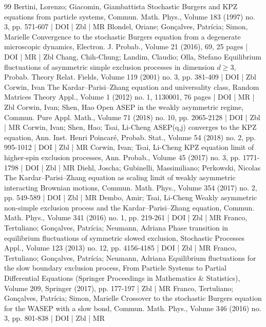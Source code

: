 \documentclass[10pt]{amsart}
\theoremstyle{definition}\newtheorem{defi}[theo]{Definition}\newtheorem{rema}[theo]{Remark}\newtheorem{exam}[theo]{Example}\newtheorem{exem}[theo]{Example}\newtheorem{nota}[theo]{Notation}
\renewcommand{\ge}{\geqslant}
\begin{document}
\begin{thebibliography}{99}
Bertini, Lorenzo; Giacomin, Giambattista Stochastic Burgers and KPZ equations from particle systems, Commun. Math. Phys., Volume 183 (1997) no. 3, pp. 571-607 | DOI | Zbl | MR
Blondel, Oriane; Gonçalves, Patrícia; Simon, Marielle Convergence to the stochastic Burgers equation from a degenerate microscopic dynamics, Electron. J. Probab., Volume 21 (2016), 69, 25 pages | DOI | MR | Zbl
Chang, Chih-Chung; Landim, Claudio; Olla, Stefano Equilibrium fluctuations of asymmetric simple exclusion processes in dimension $d\ge 3$, Probab. Theory Relat. Fields, Volume 119 (2001) no. 3, pp. 381-409 | DOI | Zbl
Corwin, Ivan The Kardar–Parisi–Zhang equation and universality class, Random Matrices Theory Appl., Volume 1 (2012) no. 1, 1130001, 76 pages | DOI | MR | Zbl
Corwin, Ivan; Shen, Hao Open ASEP in the weakly asymmetric regime, Commun. Pure Appl. Math., Volume 71 (2018) no. 10, pp. 2065-2128 | DOI | Zbl | MR
Corwin, Ivan; Shen, Hao; Tsai, Li-Cheng ASEP(q,j) converges to the KPZ equation, Ann. Inst. Henri Poincaré, Probab. Stat., Volume 54 (2018) no. 2, pp. 995-1012 | DOI | Zbl | MR
Corwin, Ivan; Tsai, Li-Cheng KPZ equation limit of higher-spin exclusion processes, Ann. Probab., Volume 45 (2017) no. 3, pp. 1771-1798 | DOI | Zbl | MR
Diehl, Joscha; Gubinelli, Massimiliano; Perkowski, Nicolas The Kardar–Parisi–Zhang equation as scaling limit of weakly asymmetric interacting Brownian motions, Commun. Math. Phys., Volume 354 (2017) no. 2, pp. 549-589 | DOI | Zbl | MR
Dembo, Amir; Tsai, Li-Cheng Weakly asymmetric non-simple exclusion process and the Kardar–Parisi–Zhang equation, Commun. Math. Phys., Volume 341 (2016) no. 1, pp. 219-261 | DOI | Zbl | MR
Franco, Tertuliano; Gonçalves, Patrícia; Neumann, Adriana Phase transition in equilibrium fluctuations of symmetric slowed exclusion, Stochastic Processes Appl., Volume 123 (2013) no. 12, pp. 4156-4185 | DOI | Zbl | MR
Franco, Tertuliano; Gonçalves, Patrícia; Neumann, Adriana Equilibrium fluctuations for the slow boundary exclusion process, From Particle Systems to Partial Differential Equations (Springer Proceedings in Mathematics \& Statistics), Volume 209, Springer (2017), pp. 177-197 | Zbl | MR
Franco, Tertuliano; Gonçalves, Patrícia; Simon, Marielle Crossover to the stochastic Burgers equation for the WASEP with a slow bond, Commun. Math. Phys., Volume 346 (2016) no. 3, pp. 801-838 | DOI | Zbl | MR

\end{thebibliography}
\end{document}
